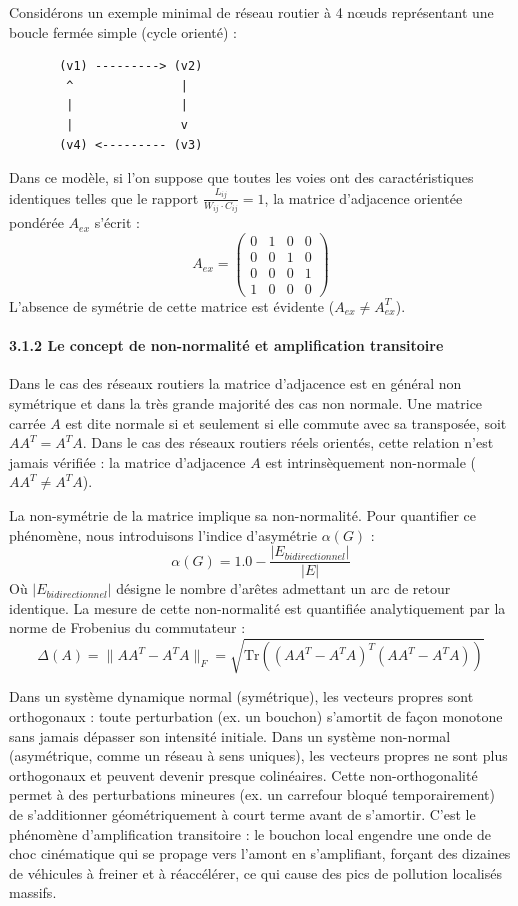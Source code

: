 \documentclass[10pt, a4paper]{article}
\begin{document}
Considérons un exemple minimal de réseau routier à 4 nœuds représentant
une boucle fermée simple (cycle orienté) :

\begin{verbatim}
       (v1) ---------> (v2)
        ^               |
        |               |
        |               v
       (v4) <--------- (v3)
\end{verbatim}

Dans ce modèle, si l'on suppose que toutes les voies ont des
caractéristiques identiques telles que le rapport
\(\frac{L_{ij}}{W_{ij} \cdot C_{ij}} = 1\), la matrice d'adjacence
orientée pondérée \(A_{ex}\) s'écrit : \[A_{ex} = \begin{pmatrix}
0 & 1 & 0 & 0 \\
0 & 0 & 1 & 0 \\
0 & 0 & 0 & 1 \\
1 & 0 & 0 & 0
\end{pmatrix}\] L'absence de symétrie de cette matrice est évidente
(\(A_{ex} \neq A_{ex}^T\)).

\paragraph{3.1.2 Le concept de non-normalité et amplification
transitoire}\label{le-concept-de-non-normalituxe9-et-amplification-transitoire}

Dans le cas des réseaux routiers la matrice d'adjacence est en général
non symétrique et dans la très grande majorité des cas non normale. Une
matrice carrée \(A\) est dite normale si et seulement si elle commute
avec sa transposée, soit \(A A^T = A^T A\). Dans le cas des réseaux
routiers réels orientés, cette relation n'est jamais vérifiée : la
matrice d'adjacence \(A\) est intrinsèquement non-normale
(\(A A^T \neq A^T A\)).

La non-symétrie de la matrice implique sa non-normalité. Pour quantifier
ce phénomène, nous introduisons l'indice d'asymétrie \(\alpha(G)\) :
\[\alpha(G) = 1.0 - \frac{|E_{bidirectionnel}|}{|E|}\] Où
\(|E_{bidirectionnel}|\) désigne le nombre d'arêtes admettant un arc de
retour identique. La mesure de cette non-normalité est quantifiée
analytiquement par la norme de Frobenius du commutateur :
\[\Delta(A) = \| A A^T - A^T A \|_F = \sqrt{\text{Tr}\left( (A A^T - A^T A)^T (A A^T - A^T A) \right)}\]

Dans un système dynamique normal (symétrique), les vecteurs propres sont
orthogonaux : toute perturbation (ex. un bouchon) s'amortit de façon
monotone sans jamais dépasser son intensité initiale. Dans un système
non-normal (asymétrique, comme un réseau à sens uniques), les vecteurs
propres ne sont plus orthogonaux et peuvent devenir presque colinéaires.
Cette non-orthogonalité permet à des perturbations mineures (ex. un
carrefour bloqué temporairement) de s'additionner géométriquement à
court terme avant de s'amortir. C'est le phénomène d'amplification
transitoire : le bouchon local engendre une onde de choc cinématique qui
se propage vers l'amont en s'amplifiant, forçant des dizaines de
véhicules à freiner et à réaccélérer, ce qui cause des pics de pollution
localisés massifs.
\end{document}
